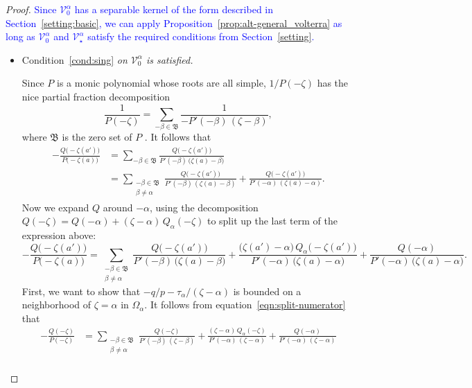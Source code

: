 \documentclass[review]{siamart220329}
\newcommand{\hardpart}{\mathcal{V}_0}
\newcommand{\softpart}{\mathcal{V}_\star}
\newcommand{\roots}{\mathfrak{B}}
\newcommand{\domain}{\Omega}
\begin{document}
\begin{proof}
\textcolor{blue}{Since $\hardpart^\alpha$ has a separable kernel of the form described in Section~\ref{setting:basic}, we can apply Proposition~\ref{prop:alt-general_volterra} as long as $\hardpart^\alpha$ and $\softpart^\alpha$ satisfy the required conditions from Section~\ref{setting}.}
\begin{itemize}
\item Condition~\eqref{cond:sing} {\em on $\hardpart^\alpha$ is satisfied.}

Since $P$ is a monic polynomial whose roots are all simple, $1/P(-\zeta)$ has the nice partial fraction decomposition
\[ \frac{1}{P(-\zeta)} = \sum_{-\beta \in \roots} \frac{1}{-P'(-\beta)\,(\zeta - \beta)}, \]
where $\roots$ is the zero set of $P$ \cite[Section 1.4, Exercise~2]{ahlfors}. 
It follows that
\begin{align*}
-\frac{Q\big(-\zeta(a')\big)}{P\big(-\zeta(a)\big)} & = \sum_{-\beta \in \roots} \frac{Q\big(-\zeta(a')\big)}{P'(-\beta)\,\big(\zeta(a) - \beta\big)} \\
& = \sum_{\substack{-\beta \in \roots \\ \beta \neq \alpha}} \frac{Q\big(-\zeta(a')\big)}{P'(-\beta)\,(\zeta(a) - \beta)} + \frac{Q\big(-\zeta(a')\big)}{P'(-\alpha)\,(\zeta(a) - \alpha)}.
\end{align*}
Now we expand $Q$ around $-\alpha$, using the decomposition $Q(-\zeta) = Q(-\alpha)+(\zeta-\alpha)\,Q_\alpha(-\zeta)$ to split up the last term of the expression above:
\begin{equation}\label{eqn:split-numerator}
-\frac{Q\big(-\zeta(a')\big)}{P\big(-\zeta(a)\big)} = \sum_{\substack{-\beta \in \roots \\ \beta \neq \alpha}} \frac{Q\big(-\zeta(a')\big)}{P'(-\beta)\,\big(\zeta(a) - \beta\big)} + \frac{\big(\zeta(a') - \alpha\big)\,Q_\alpha\big(-\zeta(a')\big)}{P'(-\alpha)\,\big(\zeta(a) - \alpha\big)} + \frac{Q(-\alpha)}{P'(-\alpha)\,\big(\zeta(a) - \alpha\big)}.
\end{equation}
First, we want to show that $-q/p-\tau_\alpha/(\zeta-\alpha)$ is bounded on a neighborhood of $\zeta = \alpha$ in $\domain_\alpha$. It follows from equation~\eqref{eqn:split-numerator} that
\begin{align*}
-\frac{Q(-\zeta)}{P(-\zeta)} & =
\sum_{\substack{-\beta \in \roots \\ \beta \neq \alpha}} \frac{Q(-\zeta)}{P'(-\beta)\,(\zeta - \beta)} + \frac{(\zeta - \alpha)\,Q_\alpha(-\zeta)}{P'(-\alpha)\,(\zeta - \alpha)} + \frac{Q(-\alpha)}{P'(-\alpha)\,(\zeta - \alpha)} \\

\end{align*}
\end{itemize}
\end{proof}
\end{document}
